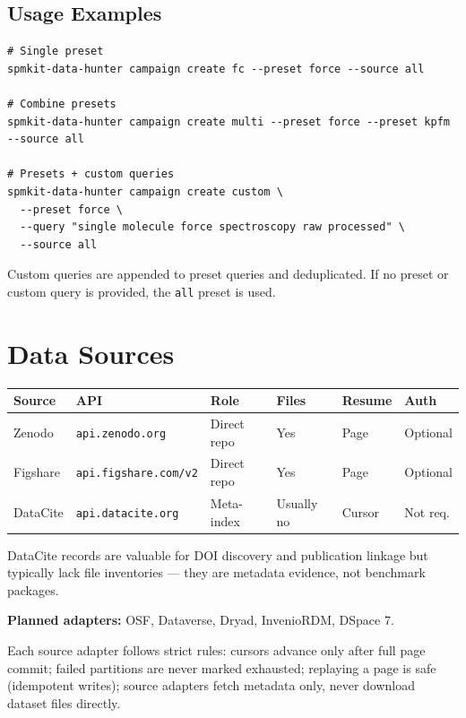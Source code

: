 \documentclass[11pt,a4paper]{article}
\begin{document}
\subsection*{Usage Examples}

\begin{lstlisting}
# Single preset
spmkit-data-hunter campaign create fc --preset force --source all

# Combine presets
spmkit-data-hunter campaign create multi --preset force --preset kpfm --source all

# Presets + custom queries
spmkit-data-hunter campaign create custom \
  --preset force \
  --query "single molecule force spectroscopy raw processed" \
  --source all
\end{lstlisting}

Custom queries are appended to preset queries and deduplicated. If no preset or custom query is provided, the \texttt{all} preset is used.

\section{Data Sources}

\begin{center}
\begin{tabular}{llllll}
\toprule
\textbf{Source} & \textbf{API} & \textbf{Role} & \textbf{Files} & \textbf{Resume} & \textbf{Auth} \\
\midrule
Zenodo & \texttt{api.zenodo.org} & Direct repo & Yes & Page & Optional \\
Figshare & \texttt{api.figshare.com/v2} & Direct repo & Yes & Page & Optional \\
DataCite & \texttt{api.datacite.org} & Meta-index & Usually no & Cursor & Not req. \\
\bottomrule
\end{tabular}
\end{center}

DataCite records are valuable for DOI discovery and publication linkage but typically lack file inventories --- they are metadata evidence, not benchmark packages.

\textbf{Planned adapters:} OSF, Dataverse, Dryad, InvenioRDM, DSpace 7.

Each source adapter follows strict rules: cursors advance only after full page commit; failed partitions are never marked exhausted; replaying a page is safe (idempotent writes); source adapters fetch metadata only, never download dataset files directly.
\end{document}
